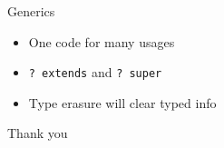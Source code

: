 \documentclass{beamer}
\begin{document}
\begin{frame}{Generics}

    \begin{itemize}
        \item One code for many usages
        \item \texttt{? extends} and \texttt{? super}
        \item Type erasure will clear typed info
    \end{itemize}
\end{frame}

\begin{frame}[c]{ }
    \centering
    Thank you
\end{frame}
\end{document}
